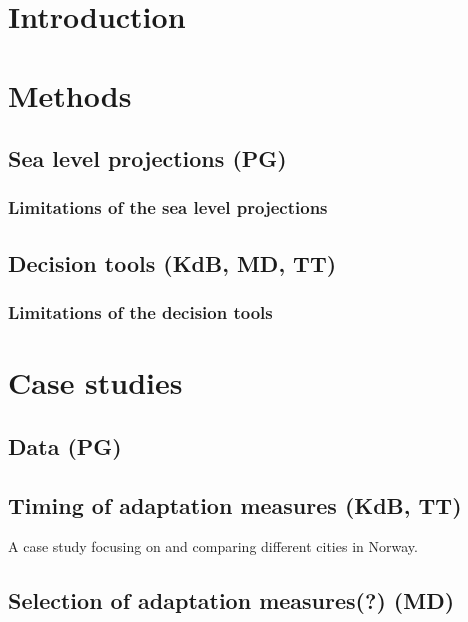 \documentclass[wrr, draft]{agutex}
\begin{document}
\begin{article}



\section{Introduction}\label{sec:intro}

\section{Methods}

\subsection{Sea level projections {\color{blue} (PG)}}

\subsubsection{Limitations of the sea level projections}

\subsection{Decision tools {\color{blue} (KdB, MD, TT)}}

\subsubsection{Limitations of the decision tools}

\section{Case studies}

\subsection{Data {\color{blue} (PG)}}

\subsection{Timing of adaptation measures {\color{blue} (KdB, TT)}}

A case study focusing on and comparing different cities in Norway.

\subsection{Selection of adaptation measures(?) {\color{blue} (MD)}}


\end{article}
\end{document}
